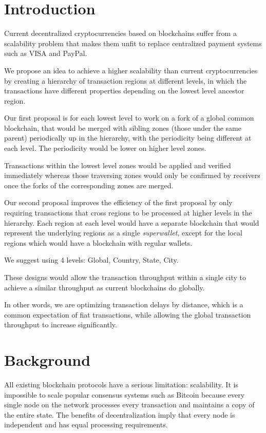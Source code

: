 \section{Introduction}

Current decentralized cryptocurrencies based on blockchains suffer from a
scalability problem that makes them unfit to replace centralized payment
systems such as VISA and PayPal.

We propose an idea to achieve a higher scalability than current
cryptocurrencies by creating a hierarchy of transaction regions at different
levels, in which the transactions have different properties depending on the
lowest level ancestor region.

Our first proposal is for each lowest level to work on a fork of a global
common blockchain, that would be merged with sibling zones (those under the
same parent) periodically up in the hierarchy, with the periodicity being
different at each level.  The periodicity would be lower on higher level zones.

Transactions within the lowest level zones would be applied and verified
immediately whereas those traversing zones would only be confirmed by receivers
once the forks of the corresponding zones are merged.

Our second proposal improves the efficiency of the first proposal by only
requiring transactions that cross regions to be processed at higher levels in
the hierarchy.  Each region at each level would have a separate blockchain that
would represent the underlying regions as a single \textit{superwallet}, except
for the local regions which would have a blockchain with regular wallets.

We suggest using 4 levels: Global, Country, State, City.

These designs would allow the transaction throughput within a single city to
achieve a similar throughput as current blockchains do globally.

In other words, we are optimizing transaction delays by distance, which is a
common expectation of fiat transactions, while allowing the global transaction
throughput to increase significantly.

\section{Background}

All existing blockchain protocols have a serious limitation: scalability. It is
impossible to scale popular consensus systems such as Bitcoin because every
single node on the network processes every transaction and maintains a copy of
the entire state. The benefits of decentralization imply that every node is
independent and has equal processing requirements.

